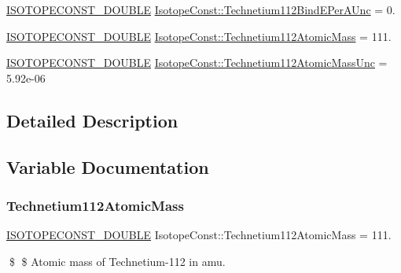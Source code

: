 \begin{DoxyCompactItemize}
\item 
\mbox{\hyperlink{group___isotope_const-_macros_ga8f45a7272ce02c0b4c65c44636ed719a}{I\+S\+O\+T\+O\+P\+E\+C\+O\+N\+S\+T\+\_\+\+D\+O\+U\+B\+LE}} \mbox{\hyperlink{group___isotope_const-_technetium-_tc112_gaae1f9ddfd5c9f7152dd2dddd908ba29a}{Isotope\+Const\+::\+Technetium112\+Bind\+E\+Per\+A\+Unc}} = 0.
\item 
\mbox{\hyperlink{group___isotope_const-_macros_ga8f45a7272ce02c0b4c65c44636ed719a}{I\+S\+O\+T\+O\+P\+E\+C\+O\+N\+S\+T\+\_\+\+D\+O\+U\+B\+LE}} \mbox{\hyperlink{group___isotope_const-_technetium-_tc112_ga3f10a731c9e4f3b0d894c099ff3174dd}{Isotope\+Const\+::\+Technetium112\+Atomic\+Mass}} = 111.
\item 
\mbox{\hyperlink{group___isotope_const-_macros_ga8f45a7272ce02c0b4c65c44636ed719a}{I\+S\+O\+T\+O\+P\+E\+C\+O\+N\+S\+T\+\_\+\+D\+O\+U\+B\+LE}} \mbox{\hyperlink{group___isotope_const-_technetium-_tc112_ga1579192708a566d3adf9ae15917b5f75}{Isotope\+Const\+::\+Technetium112\+Atomic\+Mass\+Unc}} = 5.\+92e-\/06
\end{DoxyCompactItemize}


\subsection{Detailed Description}


\subsection{Variable Documentation}
\mbox{\label{group___isotope_const-_technetium-_tc112_ga3f10a731c9e4f3b0d894c099ff3174dd}} 
\subsubsection{\texorpdfstring{Technetium112\+Atomic\+Mass}{Technetium112AtomicMass}}
{\footnotesize\ttfamily \mbox{\hyperlink{group___isotope_const-_macros_ga8f45a7272ce02c0b4c65c44636ed719a}{I\+S\+O\+T\+O\+P\+E\+C\+O\+N\+S\+T\+\_\+\+D\+O\+U\+B\+LE}} Isotope\+Const\+::\+Technetium112\+Atomic\+Mass = 111.}

\$ \$ Atomic mass of Technetium-\/112 in amu. \mbox{\label{group___isotope_const-_technetium-_tc112_ga1579192708a566d3adf9ae15917b5f75}} 
